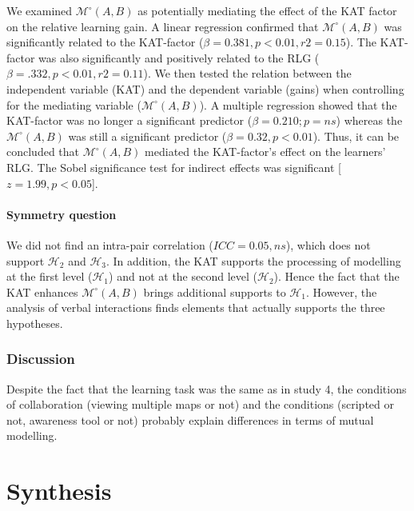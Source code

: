 \documentclass[natbib]{svjour3}
\newcommand{\gmodel}[2]{{$\mathcal{M}(#1, #2)$}}
\newcommand{\gModel}[2]{{$\mathcal{M}^{\circ}(#1, #2)$}}
\begin{document}
We examined \gModel{A}{B} as potentially mediating the effect of the KAT factor
on the relative learning gain. A linear regression confirmed that \gModel{A}{B}
was significantly related to the KAT-factor ($\beta= 0.381, p < 0.01, r2 = 0.15$).
The KAT-factor was also significantly and positively related to the RLG ($\beta=
.332, p < 0.01, r2 = 0.11$). We then tested the relation between the independent
variable (KAT) and the dependent variable (gains) when controlling for the
mediating variable (\gModel{A}{B}). A multiple regression showed that the
KAT-factor was no longer a significant predictor ($\beta= 0.210; p = ns$) whereas
the \gModel{A}{B} was still a significant predictor ($\beta= 0.32, p < 0.01$).
Thus, it can be concluded that \gModel{A}{B} mediated the KAT-factor's effect on
the learners' RLG. The Sobel significance test for indirect effects was
significant [$z = 1.99, p < 0.05$]. 

\paragraph{Symmetry question} We did not find an intra-pair correlation ($ICC =
0.05, ns$), which does not support $\mathcal{H}_{2}$ and $\mathcal{H}_{3}$. In
addition, the KAT supports the processing of modelling at the first level
($\mathcal{H}_{1}$) and not at the second level ($\mathcal{H}_{2}$). Hence the
fact that the KAT enhances  \gModel{A}{B}  brings additional supports to
$\mathcal{H}_{1}$. However, the analysis of verbal interactions finds elements
that actually supports the three hypotheses.


\subsubsection*{Discussion}

Despite the fact that the learning task was the same as in study 4, the
conditions of collaboration (viewing multiple maps or not) and the conditions
(scripted or not, awareness tool or not) probably explain differences in terms
of mutual modelling.

\section{Synthesis}
\end{document}
